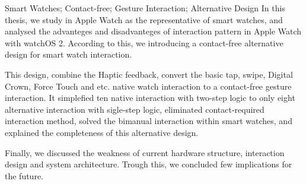 
\begin{abstract}{智能手表；非接触式；手势交互；备择设计}


本文以现有智能手表产品的代表 Apple Watch 为例，对 Apple Watch 上的交互模式的优缺点进行了全面的分析，并据此给出了一套非接触式的备择设计。其配合了 Haptic Engine 对用户的直观震动反馈，完成了对基础点按、滑动、Digital Crown、Force Touch等系列原生交互的非接触式手势交互设计，此设计将嵌套两步逻辑的十种原生交互简化为了单步逻辑上的八种备择交互，且消除了接触式交互的依赖，解决了现有交互中对双手依赖的缺陷，并同时说明了给出的备择设计的交互完备性。最后，本文对设计的硬件结构、交互方式和系统架构的现有缺陷进行了讨论，并从中得到的启示，给出了可行的解决思路。
\end{abstract}
\cleardoublepage
{} %
\begin{abstractEng}{Smart Watches; Contact-free; Gesture Interaction; Alternative Design}
In this thesis, we study in Apple Watch as the representative of smart watches, and analysed the advanteges and disadvanteges of interaction pattern in Apple Watch with watchOS 2. According to this, we introducing a contact-free alternative design for smart watch interaction.

This design, combine the Haptic feedback, convert the basic tap, swipe, Digital Crown, Force Touch and etc. native watch interaction to a contact-free gesture interaction. It simplefied ten native interaction with two-step logic to only eight alternative interaction with sigle-step logic, eliminated contact-required interaction method, solved the bimanual interaction within smart watches, and explained the completeness of this alternative design.

Finally, we discussed the weakness of current hardware structure, interaction design and system architecture. Trough this, we concluded few implications for the future.
\end{abstractEng}
